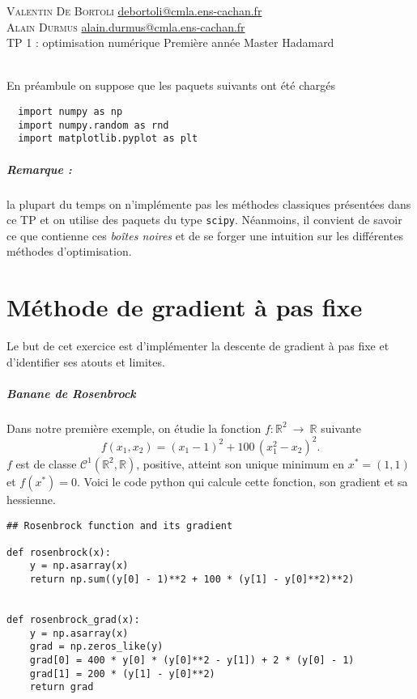 \documentclass[a4paper,french,12pt]{article}
\begin{document}
\noindent
 \textsc{Valentin De Bortoli} \hfill \url{debortoli@cmla.ens-cachan.fr} \\
    \textsc{Alain Durmus} \hfill \url{alain.durmus@cmla.ens-cachan.fr}
    \\
    TP 1 : optimisation numérique\hfill
    Première année Master Hadamard\\
\hrulefill\ \\
    
 \vspace{-5cm} 


En préambule on suppose que les paquets suivants ont été chargés
\begin{lstlisting}
  import numpy as np
  import numpy.random as rnd
  import matplotlib.pyplot as plt
\end{lstlisting}

\subparagraph{Remarque :} la plupart du temps on n'implémente pas les méthodes classiques présentées dans ce TP et on utilise des paquets du type \texttt{scipy}. Néanmoins, il convient de savoir ce que contienne ces \textit{boîtes noires} et de se forger une intuition sur les différentes méthodes d'optimisation.

\section{Méthode de gradient à pas fixe}
%
Le but de cet exercice est d'implémenter la descente de gradient à pas fixe et d'identifier ses
atouts et limites. 
\subparagraph{Banane de Rosenbrock}
Dans notre première exemple, on étudie la fonction $f: \mathbb{R}^2 \ \rightarrow \ \mathbb{R}$ suivante
\[
f(x_1,x_2) = (x_1-1)^2 + 100\, (x_1^2-x_2)^2.
\]
$f$ est de classe $\mathcal{C}^1(\mathbb{R}^2, \mathbb{R})$, positive, atteint son unique minimum en $x^* = (1,1)$ et $f(x^*) = 0$.
Voici le code python qui calcule cette fonction, son gradient et sa hessienne.
\begin{lstlisting}
## Rosenbrock function and its gradient

def rosenbrock(x):
    y = np.asarray(x)
    return np.sum((y[0] - 1)**2 + 100 * (y[1] - y[0]**2)**2)


def rosenbrock_grad(x):
    y = np.asarray(x)
    grad = np.zeros_like(y)
    grad[0] = 400 * y[0] * (y[0]**2 - y[1]) + 2 * (y[0] - 1)
    grad[1] = 200 * (y[1] - y[0]**2)
    return grad
  \end{lstlisting}
\end{document}
